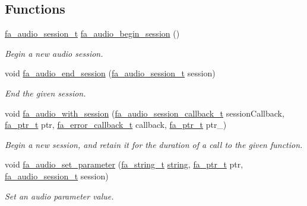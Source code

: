 \subsection*{Functions}
\begin{DoxyCompactItemize}
\item 
\hyperlink{group___fa_audio_session_ga62ee22268c23f1b18447141feccc01e0}{fa\-\_\-audio\-\_\-session\-\_\-t} \hyperlink{group___fa_audio_session_ga0022e6e72ee2f2c4c04a6165847a50dd}{fa\-\_\-audio\-\_\-begin\-\_\-session} ()
\begin{DoxyCompactList}\small\item\em Begin a new audio session. \end{DoxyCompactList}\item 
void \hyperlink{group___fa_audio_session_ga2fb042b6c0cbedf65c85a0dbb38c134b}{fa\-\_\-audio\-\_\-end\-\_\-session} (\hyperlink{group___fa_audio_session_ga62ee22268c23f1b18447141feccc01e0}{fa\-\_\-audio\-\_\-session\-\_\-t} session)
\begin{DoxyCompactList}\small\item\em End the given session. \end{DoxyCompactList}\item 
void \hyperlink{group___fa_audio_session_gabbec6678e24f6476ac04f7d759ec7ffb}{fa\-\_\-audio\-\_\-with\-\_\-session} (\hyperlink{group___fa_audio_session_gafd8f3afd0f59b1df855bbc368c2ec419}{fa\-\_\-audio\-\_\-session\-\_\-callback\-\_\-t} session\-Callback, \hyperlink{group___fa_ga915ddeae99ad7568b273d2b876425197}{fa\-\_\-ptr\-\_\-t} ptr, \hyperlink{group___fa_error_ga43d8d45a005130a5052ba3281a8bf33e}{fa\-\_\-error\-\_\-callback\-\_\-t} callback, \hyperlink{group___fa_ga915ddeae99ad7568b273d2b876425197}{fa\-\_\-ptr\-\_\-t} ptr\-\_\-)
\begin{DoxyCompactList}\small\item\em Begin a new session, and retain it for the duration of a call to the given function. \end{DoxyCompactList}\item 
void \hyperlink{group___fa_audio_session_ga82566075d8bfad3afa67fb982dc5d1a9}{fa\-\_\-audio\-\_\-set\-\_\-parameter} (\hyperlink{group___fa_string_gacada63033b77bc6c39fa632ae199349b}{fa\-\_\-string\-\_\-t} \hyperlink{util_8h_a41106000aac73b61e4fc2ef9dd39a603}{string}, \hyperlink{group___fa_ga915ddeae99ad7568b273d2b876425197}{fa\-\_\-ptr\-\_\-t} ptr, \hyperlink{group___fa_audio_session_ga62ee22268c23f1b18447141feccc01e0}{fa\-\_\-audio\-\_\-session\-\_\-t} session)
\begin{DoxyCompactList}\small\item\em Set an audio parameter value. \end{DoxyCompactList}\item 

\end{DoxyCompactItemize}
